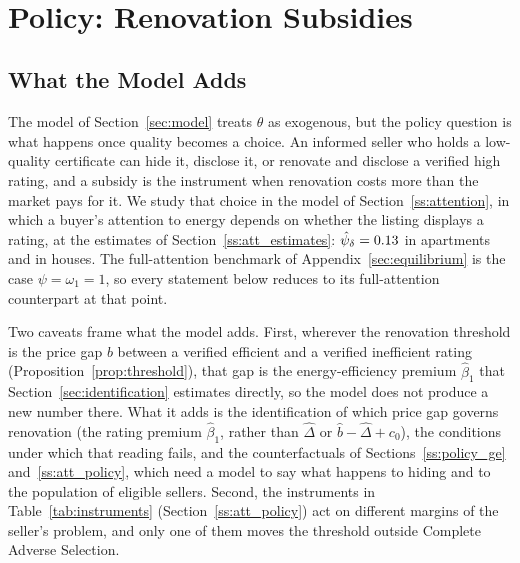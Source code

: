 \documentclass[10pt,letterpaper]{bp-template-concise}
\begin{document}
\vspace{1em}
 \\
\vspace{0.2em}










\section{Policy: Renovation Subsidies}
\label{sec:policy}

\subsection{What the Model Adds}
\label{ss:policy_scope}

The model of Section~\ref{sec:model} treats $\theta$ as exogenous, but the policy question is what happens once quality becomes a choice. An informed seller who holds a low-quality certificate can hide it, disclose it, or renovate and disclose a verified high rating, and a subsidy is the instrument when renovation costs more than the market pays for it. We study that choice in the model of Section~\ref{ss:attention}, in which a buyer's attention to energy depends on whether the listing displays a rating, at the estimates of Section~\ref{ss:att_estimates}: $\hat\psi_\delta=0.13{}$ in apartments and \attPsiHouse{} in houses. The full-attention benchmark of Appendix~\ref{sec:equilibrium} is the case $\psi=\omega_1=1$, so every statement below reduces to its full-attention counterpart at that point.

Two caveats frame what the model adds. First, wherever the renovation threshold is the price gap $b$ between a verified efficient and a verified inefficient rating (Proposition~\ref{prop:threshold}), that gap is the energy-efficiency premium $\hat\beta_1$ that Section~\ref{sec:identification} estimates directly, so the model does not produce a new number there. What it adds is the identification of which price gap governs renovation (the rating premium $\hat\beta_1$, rather than $\hat\Delta$ or $\hat b-\hat\Delta+c_0$), the conditions under which that reading fails, and the counterfactuals of Sections~\ref{ss:policy_ge} and~\ref{ss:att_policy}, which need a model to say what happens to hiding and to the population of eligible sellers. Second, the instruments in Table~\ref{tab:instruments} (Section~\ref{ss:att_policy}) act on different margins of the seller's problem, and only one of them moves the threshold outside Complete Adverse Selection.
\end{document}
